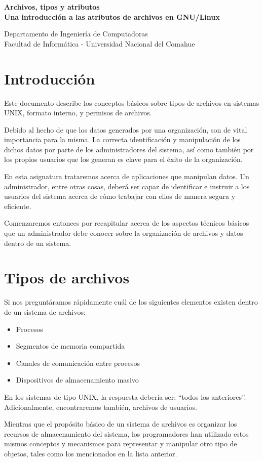 \documentclass[12pt]{article}
\def\maketitle{

\makeatletter
{\color{bl} \centering \huge \sc \textbf{
Archivos, tipos y atributos \\
\large \vspace*{-8pt} \color{black} Una introducción a las atributos de archivos en GNU/Linux
 \vspace*{8pt} }\par}
 \makeatother


 \makeatletter
 {\centering \small 
 	Departamento de Ingeniería de Computadoras \\
 	Facultad de Informática - Universidad Nacional del Comahue \\
 	\vspace{20pt} }
 \makeatother

}
\begin{document}
\thispagestyle{empty}
\maketitle
\setlength{\parindent}{0pt}


\section*{Introducción}
Este documento describe los conceptos básicos sobre tipos de archivos en 
sistemas UNIX, formato interno, y permisos de archivos. 

Debido al hecho de que los datos generados por una organización, son de vital
importancia para la misma. La correcta identificación y manipulación de los 
dichos datos por parte de los administradores del sistema, así como 
también por los propios usuarios que los generan es clave para el éxito de la
organización. 

En esta asignatura trataremos acerca de aplicaciones que manipulan datos. 
Un administrador, entre otras cosas, deberá ser capaz de identificar e instruir 
a los usuarios del sistema acerca de cómo trabajar con ellos de manera segura
y eficiente. 

Comenzaremos entonces por recapitular acerca de los aspectos técnicos básicos
que un administrador debe conocer sobre la organización de archivos y datos 
dentro de un sistema. 

\section*{Tipos de archivos}
Si nos preguntáramos rápidamente cuál de los siguientes elementos existen 
dentro de un sistema de archivos: 
\begin{itemize}
\item Procesos 
\item Segmentos de memoria compartida
\item Canales de comunicación entre procesos
\item Dispositivos de almacenamiento masivo 
\end{itemize}

En los sistemas de tipo UNIX, la respuesta debería ser: ``todos los 
anteriores''. Adicionalmente, encontraremos también, archivos de usuarios. 

Mientras que el propósito básico de un sistema de archivos es organizar 
los recursos de almacenamiento del  sistema, los programadores han utilizado
estos mismos conceptos y mecanismos para representar y manipular otro tipo 
de objetos, tales como los mencionados en la lista anterior. 
\end{document}
